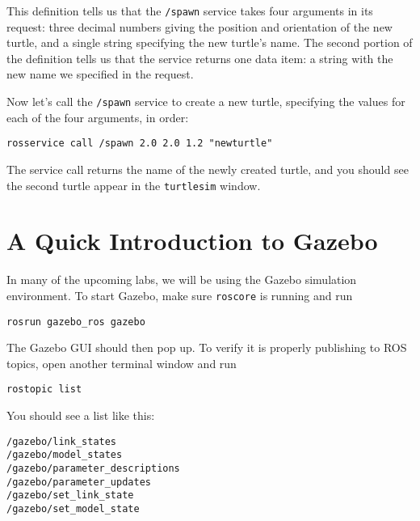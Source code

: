 \documentclass{article}
\begin{document}
This definition tells us that the \verb=/spawn= service takes four arguments in its request: three decimal numbers giving the position and orientation of the new turtle, and a single string specifying the new turtle's name. The second portion of the definition tells us that the service returns one data item: a string with the new name we specified in the request.

Now let's call the \verb=/spawn= service to create a new turtle, specifying the values for each of the four arguments, in order:
\begin{Verbatim}[frame=single]
rosservice call /spawn 2.0 2.0 1.2 "newturtle"
\end{Verbatim}
The service call returns the name of the newly created turtle, and you should see the second turtle appear in the \verb=turtlesim= window.

\section{A Quick Introduction to Gazebo}
In many of the upcoming labs, we will be using the Gazebo simulation environment. To start Gazebo, make sure \verb=roscore= is running and run
\begin{Verbatim}[frame=single]
rosrun gazebo_ros gazebo
\end{Verbatim}
The Gazebo GUI should then pop up. To verify it is properly publishing to ROS topics, open another terminal window and run
\begin{Verbatim}[frame=single]
rostopic list
\end{Verbatim}
You should see a list like this:
\begin{Verbatim}[frame=single]
/gazebo/link_states
/gazebo/model_states
/gazebo/parameter_descriptions
/gazebo/parameter_updates
/gazebo/set_link_state
/gazebo/set_model_state
\end{Verbatim}
\end{document}

